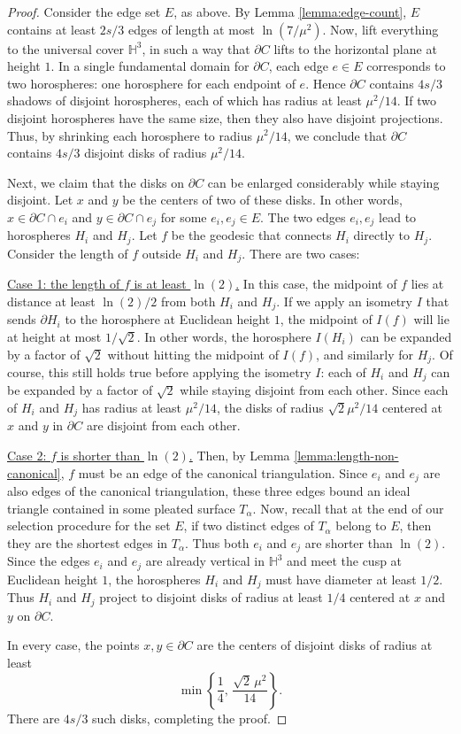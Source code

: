 \documentclass[11pt]{amsart}
\newcommand{\HH}{{\mathbb{H}}}
\newcommand{\bdy}{{\partial}}
\theoremstyle{plain}
\theoremstyle{definition}
\begin{document}
\begin{proof}
Consider the edge set $E$, as above.  By Lemma \ref{lemma:edge-count},
$E$ contains at least $2s/3$ edges of length at most $\ln(7/\mu^2)$.
Now, lift everything to the universal cover $\HH^3$, in such a way
that $\bdy C$ lifts to the horizontal plane at height $1$. In a single
fundamental domain for $\bdy C$, each edge $e \in E$ corresponds to
two horospheres: one horosphere for each endpoint of $e$.  Hence $\bdy
C$ contains $4s/3$ shadows of disjoint horospheres, each of which has
radius at least $\mu^2/14$.  If two disjoint horospheres have the same
size, then they also have disjoint projections.  Thus, by shrinking
each horosphere to radius $\mu^2/14$, we conclude that $\bdy C$
contains $4s/3$ disjoint disks of radius $\mu^2/14$.

Next, we claim that the disks on $\bdy C$ can be enlarged considerably
while staying disjoint.  Let $x$ and $y$ be the centers of two of
these disks.  In other words, $x \in \bdy C \cap e_i$ and $y \in \bdy
C \cap e_j$ for some $e_i, e_j \in E$.  The two edges $e_i, e_j$ lead
to horospheres $H_i$ and $H_j$. Let $f$ be the geodesic that connects
$H_i$ directly to $H_j$.  Consider the length of $f$ outside $H_i$ and
$H_j$.  There are two cases:

\smallskip
\underline{Case 1: the length of $f$ is at least $\ln(2)$.}  In this
case, the midpoint of $f$ lies at distance at least $\ln(2)/2$ from
both $H_i$ and $H_j$.  If we apply an isometry $I$ that sends $\bdy
H_i$ to the horosphere at Euclidean height $1$, the midpoint of $I(f)$
will lie at height at most $1/\sqrt{2}$.  In other words, the
horosphere $I(H_i)$ can be expanded by a factor of $\sqrt{2}$ without
hitting the midpoint of $I(f)$, and similarly for $H_j$.  Of course,
this still holds true before applying the isometry $I$: each of $H_i$
and $H_j$ can be expanded by a factor of $\sqrt{2}$ while staying
disjoint from each other.  Since each of $H_i$ and $H_j$ has radius at
least $\mu^2/14$, the disks of radius $\sqrt{2}\mu^2/14$ centered at
$x$ and $y$ in $\bdy C$ are disjoint from each other.

\smallskip
\underline{Case 2: $f$ is shorter than $\ln(2)$.}  Then, by Lemma
\ref{lemma:length-non-canonical}, $f$ must be an edge of the canonical
triangulation.  Since $e_i$ and $e_j$ are also edges of the canonical
triangulation, these three edges bound an ideal triangle contained in
some pleated surface $T_\alpha$.  Now, recall that at the end of our
selection procedure for the set $E$, if two distinct edges of
$T_\alpha$ belong to $E$, then they are the shortest edges in
$T_\alpha$.  Thus both $e_i$ and $e_j$ are shorter than $\ln(2)$.
Since the edges $e_i$ and $e_j$ are already vertical in $\HH^3$ and
meet the cusp at Euclidean height $1$, the horospheres $H_i$ and $H_j$
must have diameter at least $1/2$.  Thus $H_i$ and $H_j$ project to
disjoint disks of radius at least $1/4$ centered at $x$ and $y$ on
$\bdy C$.

\smallskip
In every case, the points $x,y \in \bdy C$ are the centers of disjoint
disks of radius at least
$$\min \left\{ \frac{1}{4}, \, \frac{\sqrt{2} \, \mu^2}{14}
\right\}.$$
%
There are $4s/3$ such disks, completing the proof.
\end{proof}
\end{document}
